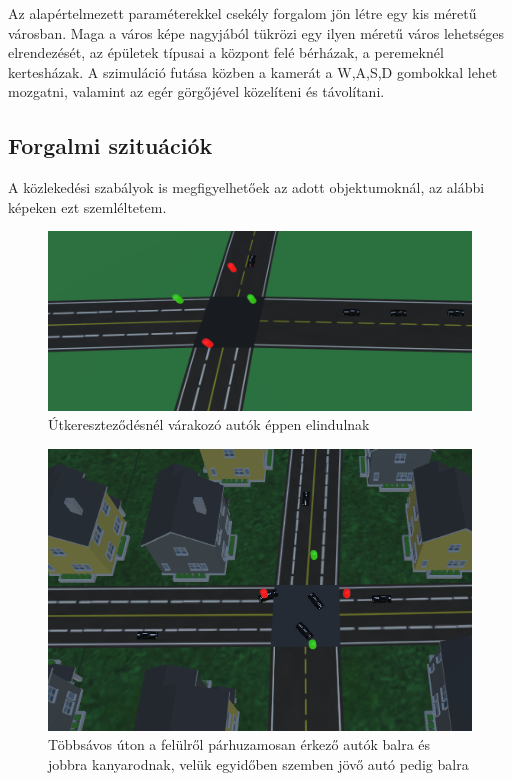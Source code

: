 Az alapértelmezett paraméterekkel csekély forgalom jön létre egy kis méretű városban. Maga a város képe nagyjából tükrözi egy ilyen méretű város lehetséges elrendezését, az épületek típusai a központ felé bérházak, a peremeknél kertesházak. A szimuláció futása közben a kamerát a W,A,S,D gombokkal lehet mozgatni, valamint az egér görgőjével közelíteni és távolítani.

\subsection{Forgalmi szituációk}
A közlekedési szabályok is megfigyelhetőek az adott objektumoknál, az alábbi képeken ezt szemléltetem.
\begin{figure}[H]
\includegraphics[width=\linewidth]{trafficLight.png}
\caption{Útkereszteződésnél várakozó autók éppen elindulnak}
\label{fig:xroadlight}
\end{figure}
\begin{figure}[H]
\includegraphics[width=\linewidth]{smalltowntraffic.png}
\caption{Többsávos úton a felülről párhuzamosan érkező autók balra és jobbra kanyarodnak, velük egyidőben szemben jövő autó pedig balra}
\label{fig:multilane}
\end{figure}
